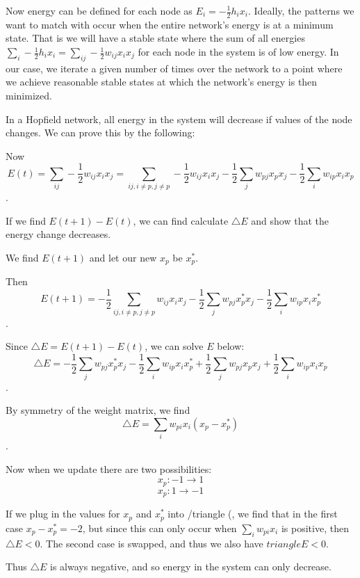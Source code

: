 \documentclass[]{article}
\begin{document}
\hfill \break
Now energy can be defined for each node as \(E_{i} = -\frac{1}{2}h_{i}x_{i}\).   Ideally, the patterns we want to match with occur when the entire network’s energy is at a minimum state.  That is we will have a stable state where the sum of all energies \(\sum_{i} -\frac{1}{2}h_{i}x_{i} = \sum_{ij} -\frac{1}{2}w_{ij}x_{i}x_{j}\) for each node in the system is of low energy.  In our case, we iterate a given number of times over the network to a point where we achieve reasonable stable states at which the network’s energy is then minimized. 

\hfill \break
In a Hopfield network, all energy in the system will decrease if values of the node changes.  We can prove this by the following: 
	
	Now \[E(t) = \sum_{ij} -\frac{1}{2}w_{ij}x_{i}x_{j} = \sum_{ij,i\neq p,j \neq p} -\frac{1}{2}w_{ij}x_{i}x_{j} - \frac{1}{2} \sum_{j} w_{pj}x_{p}x_{j} - \frac{1}{2} \sum_{i} w_{ip}x_{i}x_{p}\].
	
	If we find \(E(t+1) - E(t)\), we can find calculate \(\triangle E\) and show that the energy change decreases.
	
	We find \(E(t+1)\) and let our new \(x_{p}\) be \(x^{*}_{p}\).
	
	Then \[E(t+1) = -\frac{1}{2}\sum_{ij,i\neq p,j \neq p} w_{ij}x_{i}x_{j} - \frac{1}{2} \sum_{j} w_{pj}x^{*}_{p}x_{j} - \frac{1}{2} \sum_{i} w_{ip}x_{i}x^{*}_{p}\].
	
	Since \(\triangle E = E(t+1) - E(t)\), we can solve \triangle \(E\) below:
	\[\triangle E = - \frac{1}{2} \sum_{j} w_{pj}x^{*}_{p}x_{j} - \frac{1}{2} \sum_{i} w_{ip}x_{i}x^{*}_{p} + \frac{1}{2} \sum_{j} w_{pj}x_{p}x_{j} + \frac{1}{2} \sum_{i} w_{ip}x_{i}x_{p}\].
	
	By symmetry of the weight matrix, we find
	\[\triangle E = \sum_{i} w_{pi}x_{i}(x_{p}-x^{*}_{p})\].
	
	Now when we update there are two possibilities:
	\[x_{p} : -1 \rightarrow 1\]
	\[x_{p} : 1 \rightarrow -1\]
	
	If we plug in the values for \(x_{p}\) and \(x^{*}_{p}\) into /triangle (\E\), we find that in the first case \(x_{p}-x^{*}_{p} = -2\), but since this can only occur when \(\sum_{i} w_{pi}x_{i}\) is positive, then \(\triangle E < 0\).  The second case is swapped, and thus we also have \(triangle E < 0\).
	
	Thus \(\triangle E\) is always negative, and so energy in the system can only decrease.
	
	
\end{document}
